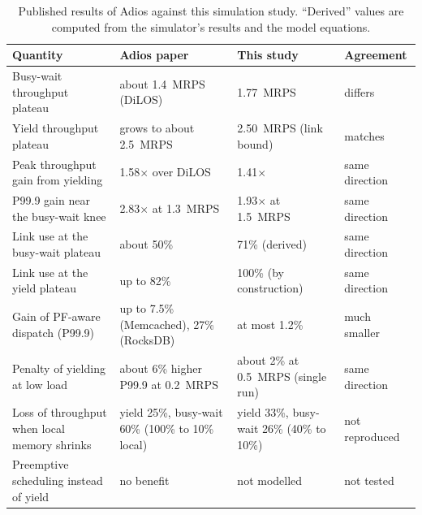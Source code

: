 \begin{table}[t]
\caption{Published results of Adios \cite{adios} against this simulation study. ``Derived'' values are computed from the simulator's results and the model equations.}
\label{tab:paperlink}
\centering
\footnotesize
\begin{tabular}{p{4.6cm}p{4.7cm}p{4.6cm}p{2.4cm}}
\toprule
Quantity & Adios paper & This study & Agreement \\
\midrule
Busy-wait throughput plateau & about 1.4~MRPS (DiLOS) & 1.77~MRPS & differs \\
Yield throughput plateau & grows to about 2.5~MRPS & 2.50~MRPS (link bound) & matches \\
Peak throughput gain from yielding & 1.58$\times$ over DiLOS & 1.41$\times$ & same direction \\
P99.9 gain near the busy-wait knee & 2.83$\times$ at 1.3~MRPS & 1.93$\times$ at 1.5~MRPS & same direction \\
Link use at the busy-wait plateau & about 50\% & 71\% (derived) & same direction \\
Link use at the yield plateau & up to 82\% & 100\% (by construction) & same direction \\
Gain of PF-aware dispatch (P99.9) & up to 7.5\% (Memcached), 27\% (RocksDB) & at most 1.2\% & much smaller \\
Penalty of yielding at low load & about 6\% higher P99.9 at 0.2~MRPS & about 2\% at 0.5~MRPS (single run) & same direction \\
Loss of throughput when local memory shrinks & yield 25\%, busy-wait 60\% (100\% to 10\% local) & yield 33\%, busy-wait 26\% (40\% to 10\%) & not reproduced \\
Preemptive scheduling instead of yield & no benefit & not modelled & not tested \\
\bottomrule
\end{tabular}
\end{table}
